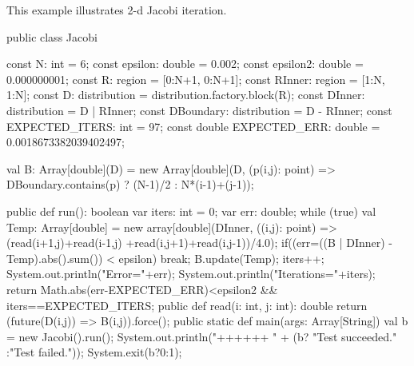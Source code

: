 
This example illustrates 2-d Jacobi iteration.

\begin{xten}
public class Jacobi {
   const N: int = 6;
   const epsilon: double = 0.002;
   const epsilon2: double = 0.000000001;
   const R: region = [0:N+1, 0:N+1];
   const RInner: region = [1:N, 1:N];
   const D: distribution = distribution.factory.block(R);
   const DInner: distribution = D | RInner;
   const DBoundary: distribution = D - RInner;
   const EXPECTED_ITERS: int  = 97;
   const double EXPECTED_ERR: double = 0.0018673382039402497;
     
   val B: Array[double](D) = new Array[double](D,
        (p(i,j): point) => DBoundary.contains(p) ? (N-1)/2 : N*(i-1)+(j-1));
    
   public def run(): boolean {
      var iters: int = 0;
      var err: double;
      while (true) {
        val Temp: Array[double] = 
           new array[double](DInner, ((i,j): point) =>
             (read(i+1,j)+read(i-1,j) +read(i,j+1)+read(i,j-1))/4.0);
        if((err=((B | DInner) - Temp).abs().sum()) < epsilon)
           break; 
        B.update(Temp);
        iters++; 
      }
      System.out.println("Error="+err);
      System.out.println("Iterations="+iters);
      return Math.abs(err-EXPECTED_ERR)<epsilon2 
          && iters==EXPECTED_ITERS;
   }
   public def read(i: int, j: int): double {
      return (future(D(i,j)) => B(i,j)).force();
   }
   public static def main(args: Array[String]) {
      val b = new Jacobi().run();
      System.out.println("++++++ "
                         + (b? "Test succeeded."
                             :"Test failed."));
      System.exit(b?0:1);
   }
}
\end{xten}
